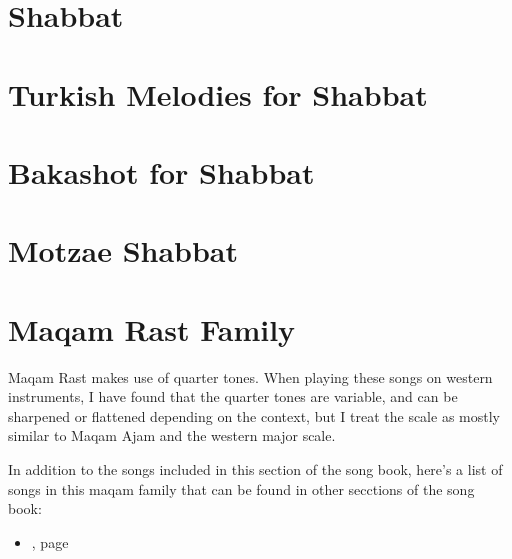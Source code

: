 \documentclass[letterpaper]{memoir}
\newcommand{\song}[2]{}
\newcommand{\songref}[1]{\nameref{#1}, page \pageref{#1}}
\begin{document}
\chapter{Shabbat}
\song{Ashir La'el Asher Shavat}{Ashir_Lael_Asher_Shavat.pdf}

\chapter{Turkish Melodies for Shabbat}
\song{Yoducha Rayonai}{Yoducha_Rayonai_Turkish_with_octave_up.pdf}
\song{Yom HaShabbat Ein Kamohu}{Yom_HaShabbat_Ein_Kamohu_Turkish.pdf}
\song{Ki Eshmerah Shabbat}{Ki_Eshmerah_Shabbat_Turkish.pdf}

\chapter{Bakashot for Shabbat}
\song{L'maancha v'lo Lanu}{Lmaancha_vlo_lanu.pdf}
\song{Yom Zeh Shiru La'el}{Yom_Zeh_Shiru_Lael.pdf}
\song{Yoducha Rayonai}{Yoducha_Rayonai.pdf}
\song{Yoducha Rayonai \#2}{Yoducha_Rayonai_2.pdf}
\song{Yah Ribon Alam}{Yah_Ribon_Alam.pdf}
\song{Yah Ribon Alam \#2}{Yah_Ribon_Alam_2.pdf}
\song{Yedid Nefesh}{Yedid_Nefesh.pdf}
\song{Agadelcha}{Agadelcha.pdf}

\chapter{Motzae Shabbat}
\song{Al Tira Avdi Yaakov}{Al_Tira_Avdi_Yaakov.pdf}

\chapter{Maqam Rast Family}
Maqam Rast makes use of quarter tones. When playing these songs on 
western instruments, I have found that the quarter tones are variable, 
and can be sharpened or flattened depending on the context, but I treat 
the scale as mostly similar to Maqam Ajam and the western major scale.

In addition to the songs included in this section of the song book, 
here's a list of songs in this maqam family that can be found in other 
secctions of the song book:
\begin{itemize}
   \item \songref{Yah_Ribon_Alam.pdf}
\end{itemize}
\song{Eli Yah Eli}{Eli_Yah_Eli.pdf} %
\song{Riva Riva}{Riva_Riva.pdf}
\song{El Hon}{El_Hon.pdf}
\song{Boee B'rinah}{Boee_Brinah.pdf}
\song{N'imah Li}{Nimah_Li.pdf}
\song{Rachum Bach Yagel Levavi}{Rachum_Bach_Yagel_Levavi.pdf}
\end{document}
